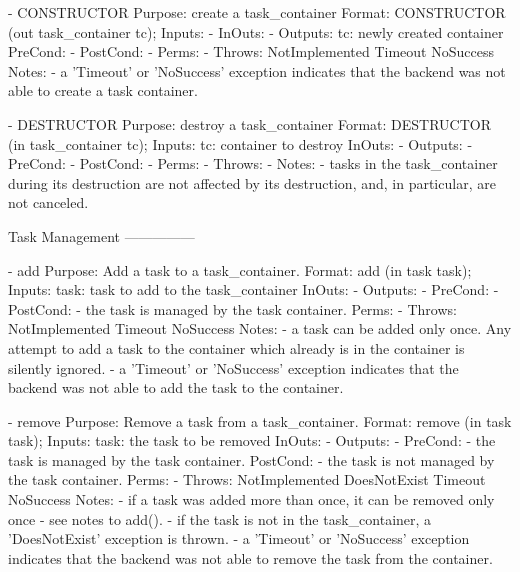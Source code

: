  
 \begin{myspec}
    - CONSTRUCTOR
      Purpose:  create a task_container
      Format:   CONSTRUCTOR          (out task_container tc);
      Inputs:   -
      InOuts:   -
      Outputs:  tc:                   newly created container
      PreCond:  -
      PostCond: -
      Perms:    -
      Throws:   NotImplemented
                Timeout
                NoSuccess
      Notes:    - a 'Timeout' or 'NoSuccess' exception indicates
                  that the backend was not able to create a task
                  container.
 
 
    - DESTRUCTOR
      Purpose:  destroy a task_container
      Format:   DESTRUCTOR           (in task_container tc);
      Inputs:   tc:                   container to destroy
      InOuts:   -
      Outputs:  -
      PreCond:  -
      PostCond: -
      Perms:    -
      Throws:   -
      Notes:    - tasks in the task_container during its
                  destruction are not affected by its
                  destruction, and, in particular, are not
                  canceled.
 
 
    Task Management
    ---------------
 
    - add
      Purpose:  Add a task to a task_container.
      Format:   add                  (in  task task);
      Inputs:   task:                 task to add to the
                                      task_container
      InOuts:   -
      Outputs:  -
      PreCond:  -
      PostCond: - the task is managed by the task container.
      Perms:    -
      Throws:   NotImplemented
                Timeout
                NoSuccess
      Notes:    - a task can be added only once.  Any attempt 
                  to add a task to the container which already 
                  is in the container is silently ignored.
                - a 'Timeout' or 'NoSuccess' exception indicates
                  that the backend was not able to add the task
                  to the container.
 
 
    - remove
      Purpose:  Remove a task from a task_container.
      Format:   remove               (in  task task);
      Inputs:   task:                 the task to be removed
      InOuts:   -
      Outputs:  -
      PreCond:  - the task is managed by the task container.
      PostCond: - the task is not managed by the task container.
      Perms:    -
      Throws:   NotImplemented
                DoesNotExist
                Timeout
                NoSuccess
      Notes:    - if a task was added more than once, it can be
                  removed only once - see notes to add().
                - if the task is not in the task_container, a 
                  'DoesNotExist' exception is thrown.
                - a 'Timeout' or 'NoSuccess' exception indicates
                  that the backend was not able to remove the 
                  task from the container.
 

\end{myspec}
